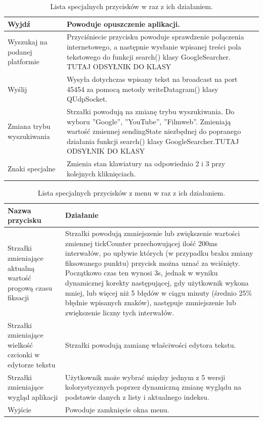 \documentclass[twoside,a4paper]{book}
\begin{document}
\begin{table}
\begin{tabular}{|p{4cm}|p{8.5cm}|}
     Wyjdź & Powoduje opuszczenie aplikacji.\\ \hline 
      Wyszukaj na podanej platformie & Przyciśniecie przycisku powoduje sprawdzenie połączenia internetowego, a następnie wysłanie wpisanej treści pola tekstowego do funkcji search() klasy GoogleSearcher. TUTAJ ODSYŁNIK DO KLASY\\ \hline
        Wyślij & Wysyła dotychczas wpisany tekst na broadcast na port 45454 za pomocą metody writeDatagram() klasy QUdpSocket.\\ \hline
    Zmiana trybu wyszukiwania & Strzałki powodują na zmianę trybu wyszukiwania. Do wyboru ''Google'', ''YouTube'', ''Filmweb''. Zmieniają wartość zmiennej sendingState niezbędnej do popranego działania funkcji  search() klasy GoogleSearcher.TUTAJ ODSYŁNIK DO KLASY\\ \hline 
    Znaki specjalne & Zmienia stan klawiatury na odpowiednio 2 i 3 przy kolejnych kliknięciach. \\ \hline
       \end{tabular}
    \caption{Lista specjalnych przycisków w raz z ich działaniem.} 
    \label{table:specialButtons}
\end{table}
\begin{table}
    \begin{tabular}{|p{4cm}|p{8.5cm}|}
        \hline
    \textbf{Nazwa przycisku} & \textbf{Działanie}\\ \hline
       Strzałki zmieniające aktualną wartość progową czasu fiksacji & Strzałki powodują zmniejszenie lub zwiększenie wartości zmiennej tickCounter przechowującej ilość 200ms interwałów, po upływie których (w przypadku braku zmiany fiksowanego punktu) przycisk można uznać za wciśnięty. Początkowo czas ten wynosi 3s, jednak w wyniku dynamicznej korekty następującej, gdy użytkownik wykona mniej, lub więcej niż 5 błędów w ciągu minuty (średnio 25\% błędnie wpisanych znaków), następuje zmniejszenie lub zwiększenie liczny tych interwałów. \\ \hline  
       Strzałki zmieniające wielkość czcionki w edytorze tekstu & Strzałki powodują zamianę właściwości edytora tekstu. \\ \hline
       Strzałki zmieniające wygląd aplikacji & Użytkownik może wybrać między jednym z 5 wersji kolorystycznych poprzez dynamiczną zmianę wyglądu na podstawie danych z listy i aktualnego indeksu.  \\ \hline    
       Wyjście & Powoduje zamknięcie okna menu. \\ \hline
    \end{tabular}
    \caption{Lista specjalnych przycisków z menu w raz z ich działaniem.} 
    \label{table:specialButtonsMenu}
\end{table}
\end{document}
